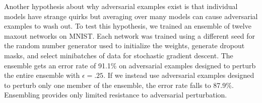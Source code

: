 \documentclass{article} %
\def\eps{{\epsilon}}
\begin{document}
%
Another hypothesis about why adversarial examples exist is that individual models have strange quirks but averaging over many models can
cause adversarial examples to wash out. To test this hypothesis, we trained an ensemble of twelve
maxout networks on MNIST. Each network was trained using a different seed for the random number generator
used to initialize the weights, generate dropout masks, and select minibatches of data for stochastic
gradient descent. The ensemble gets an error rate of 91.1\% on adversarial examples designed
to perturb the entire ensemble with $\epsilon = .25$. If we instead use adversarial examples designed to perturb only one
member of the ensemble, the error rate falls to 87.9\%. Ensembling provides only
limited resistance to adversarial perturbation.
\end{document}
